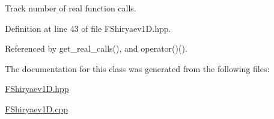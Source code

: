 \-Track number of real function calls. 



\-Definition at line 43 of file \-F\-Shiryaev1\-D.\-hpp.



\-Referenced by get\-\_\-real\-\_\-calls(), and operator()().



\-The documentation for this class was generated from the following files\-:\begin{DoxyCompactItemize}
\item 
\hyperlink{FShiryaev1D_8hpp}{\-F\-Shiryaev1\-D.\-hpp}\item 
\hyperlink{FShiryaev1D_8cpp}{\-F\-Shiryaev1\-D.\-cpp}\end{DoxyCompactItemize}

